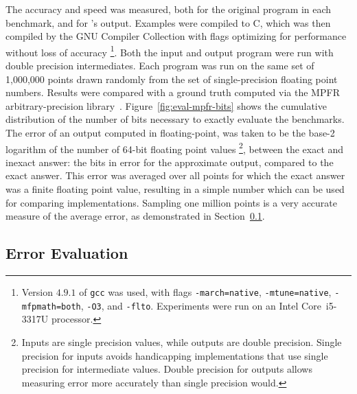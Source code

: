 \documentclass[paper.tex]{subfiles}
\begin{document}
The accuracy and speed was measured, both for the original program in
each benchmark, and for \casio's output.  Examples were compiled to C,
which was then compiled by the GNU Compiler Collection with flags
optimizing for performance without loss of accuracy%
\footnote{Version $4.9.1$ of \texttt{gcc} was used, with flags
  \texttt{-march=native}, \texttt{-mtune=native},
  \texttt{-mfpmath=both}, \texttt{-O3}, and \texttt{-flto}.
  Experiments were run on an Intel Core~i5-3317U processor.}.
Both the input and output
program were run with double precision intermediates.  Each program was run on the same set of
1,000,000 points drawn randomly from the set of single-precision
floating point numbers.  Results were compared with a ground truth
computed via the MPFR arbitrary-precision library~\cite{acm07-mpfr}.
Figure~\ref{fig:eval-mpfr-bits} shows the cumulative distribution of
the number of bits necessary to exactly evaluate the benchmarks.  The
error of an output computed in floating-point, was taken to be the
base-2 logarithm of the number of 64-bit floating point values%
\footnote{Inputs are single precision values, while outputs are double
  precision.  Single precision for inputs avoids handicapping
  implementations that use single precision for intermediate values.
  Double precision for outputs allows measuring error more accurately
  than single precision would.}, between the exact and inexact answer:
the bits in error for the approximate output, compared to the exact
answer.  This error was averaged over all points for which the exact
answer was a finite floating point value, resulting in a simple number
which can be used for comparing implementations.  Sampling one million
points is a very accurate measure of the average error, as
demonstrated in Section~\ref{sec:eval-eval}.

\subsection{Error Evaluation}
\label{sec:eval-eval}
\end{document}
